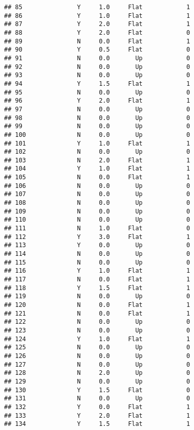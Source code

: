 \documentclass[
]{article}
\begin{document}
\begin{verbatim}
## 85               Y     1.0     Flat            1
## 86               Y     1.0     Flat            1
## 87               Y     2.0     Flat            1
## 88               Y     2.0     Flat            0
## 89               N     0.0     Flat            1
## 90               Y     0.5     Flat            0
## 91               N     0.0       Up            0
## 92               N     0.0       Up            0
## 93               N     0.0       Up            0
## 94               Y     1.5     Flat            1
## 95               N     0.0       Up            0
## 96               Y     2.0     Flat            1
## 97               N     0.0       Up            0
## 98               N     0.0       Up            0
## 99               N     0.0       Up            0
## 100              N     0.0       Up            0
## 101              Y     1.0     Flat            1
## 102              N     0.0       Up            0
## 103              N     2.0     Flat            1
## 104              Y     1.0     Flat            1
## 105              N     0.0     Flat            1
## 106              N     0.0       Up            0
## 107              N     0.0       Up            0
## 108              N     0.0       Up            0
## 109              N     0.0       Up            0
## 110              N     0.0       Up            0
## 111              N     1.0     Flat            0
## 112              Y     3.0     Flat            1
## 113              Y     0.0       Up            0
## 114              N     0.0       Up            0
## 115              N     0.0       Up            0
## 116              Y     1.0     Flat            1
## 117              N     0.0     Flat            1
## 118              Y     1.5     Flat            1
## 119              N     0.0       Up            0
## 120              N     0.0     Flat            1
## 121              N     0.0     Flat            1
## 122              N     0.0       Up            0
## 123              N     0.0       Up            0
## 124              Y     1.0     Flat            1
## 125              N     0.0       Up            0
## 126              N     0.0       Up            0
## 127              N     0.0       Up            0
## 128              N     2.0       Up            0
## 129              N     0.0       Up            0
## 130              Y     1.5     Flat            0
## 131              N     0.0       Up            0
## 132              Y     0.0     Flat            1
## 133              Y     2.0     Flat            1
## 134              Y     1.5     Flat            1

\end{verbatim}
\end{document}
